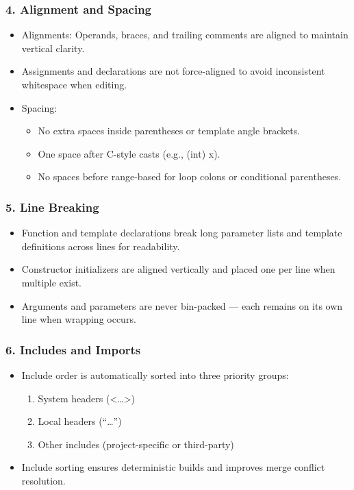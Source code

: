 \subsubsection*{4. Alignment and Spacing}
\begin{itemize}
    \item
    Alignments: Operands, braces, and trailing comments are aligned to maintain vertical clarity.
    \item
    Assignments and declarations are not force-aligned to avoid inconsistent whitespace when editing.
    \item
    Spacing:
    \begin{itemize}
    \item
    No extra spaces inside parentheses or template angle brackets.
    \item
    One space after C-style casts (e.g., (int) x).
    \item
    No spaces before range-based for loop colons or conditional parentheses.
\end{itemize}
\end{itemize}
\subsubsection*{5. Line Breaking}
\begin{itemize}
    \item
    Function and template declarations break long parameter lists and template definitions across lines for readability.
    \item
    Constructor initializers are aligned vertically and placed one per line when multiple exist.
    \item
    Arguments and parameters are never bin-packed — each remains on its own line when wrapping occurs.
\end{itemize}
\subsubsection*{6. Includes and Imports}
\begin{itemize}
    \item
    Include order is automatically sorted into three priority groups:
    \begin{enumerate}
    \item
    System headers (\textless\ldots\textgreater)
    \item
    Local headers (\textquotedblleft\ldots\textquotedblright)
    \item
    Other includes (project-specific or third-party)
    \end{enumerate}
    \item
    Include sorting ensures deterministic builds and improves merge conflict resolution.
\end{itemize}
